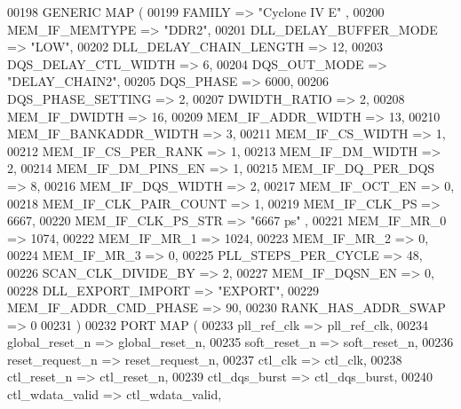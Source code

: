 \begin{DoxyCode}
{00198     \textcolor{keywordflow}{GENERIC} \textcolor{keywordflow}{MAP} (
00199         FAMILY => \textcolor{keyword}{"Cyclone IV E"}  ,
00200         MEM\_IF\_MEMTYPE => \textcolor{keyword}{"DDR2"},
00201         DLL\_DELAY\_BUFFER\_MODE => \textcolor{keyword}{"LOW"},
00202         DLL\_DELAY\_CHAIN\_LENGTH => \textcolor{vhdllogic}{12},
00203         DQS\_DELAY\_CTL\_WIDTH => \textcolor{vhdllogic}{6},
00204         DQS\_OUT\_MODE => \textcolor{keyword}{"DELAY\_CHAIN2"},
00205         DQS\_PHASE => \textcolor{vhdllogic}{6000},
00206         DQS\_PHASE\_SETTING => \textcolor{vhdllogic}{2},
00207         DWIDTH\_RATIO => \textcolor{vhdllogic}{2},
00208         MEM\_IF\_DWIDTH => \textcolor{vhdllogic}{16},
00209         MEM\_IF\_ADDR\_WIDTH => \textcolor{vhdllogic}{13},
00210         MEM\_IF\_BANKADDR\_WIDTH => \textcolor{vhdllogic}{3},
00211         MEM\_IF\_CS\_WIDTH => \textcolor{vhdllogic}{1},
00212         MEM\_IF\_CS\_PER\_RANK => \textcolor{vhdllogic}{1},
00213         MEM\_IF\_DM\_WIDTH => \textcolor{vhdllogic}{2},
00214         MEM\_IF\_DM\_PINS\_EN => \textcolor{vhdllogic}{1},
00215         MEM\_IF\_DQ\_PER\_DQS => \textcolor{vhdllogic}{8},
00216         MEM\_IF\_DQS\_WIDTH => \textcolor{vhdllogic}{2},
00217         MEM\_IF\_OCT\_EN => \textcolor{vhdllogic}{0},
00218         MEM\_IF\_CLK\_PAIR\_COUNT => \textcolor{vhdllogic}{1},
00219         MEM\_IF\_CLK\_PS => \textcolor{vhdllogic}{6667},
00220         MEM\_IF\_CLK\_PS\_STR => "\textcolor{vhdllogic}{6667 ps}" ,
00221         MEM\_IF\_MR\_0 => \textcolor{vhdllogic}{1074},
00222         MEM\_IF\_MR\_1 => \textcolor{vhdllogic}{1024},
00223         MEM\_IF\_MR\_2 => \textcolor{vhdllogic}{0},
00224         MEM\_IF\_MR\_3 => \textcolor{vhdllogic}{0},
00225         PLL\_STEPS\_PER\_CYCLE => \textcolor{vhdllogic}{48},
00226         SCAN\_CLK\_DIVIDE\_BY => \textcolor{vhdllogic}{2},
00227         MEM\_IF\_DQSN\_EN => \textcolor{vhdllogic}{0},
00228         DLL\_EXPORT\_IMPORT => \textcolor{keyword}{"EXPORT"},
00229         MEM\_IF\_ADDR\_CMD\_PHASE => \textcolor{vhdllogic}{90},
00230         RANK\_HAS\_ADDR\_SWAP => \textcolor{vhdllogic}{0}
00231     \textcolor{vhdlchar}{)}
00232     \textcolor{keywordflow}{PORT} \textcolor{keywordflow}{MAP} (
00233         pll\_ref\_clk  =>  pll_ref_clk,
00234         global\_reset\_n  =>  global_reset_n,
00235         soft\_reset\_n  =>  soft_reset_n,
00236         reset\_request\_n  =>  reset_request_n,
00237         ctl\_clk  =>  ctl_clk,
00238         ctl\_reset\_n  =>  ctl_reset_n,
00239         ctl\_dqs\_burst  =>  ctl_dqs_burst,
00240         ctl\_wdata\_valid  =>  ctl_wdata_valid,
}
\end{DoxyCode}
